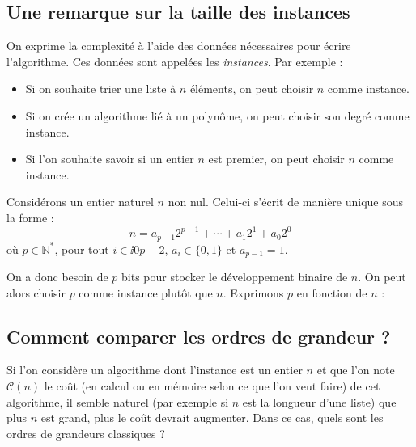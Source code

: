 \documentclass[french,11pt,twoside]{VcCours}
\begin{document}
\subsection{Une remarque sur la taille des instances}
On exprime la complexité à l'aide des données nécessaires pour écrire l'algorithme. Ces données sont appelées les \emph{instances}. Par exemple :

\begin{itemize}
\item Si on souhaite trier une liste à $n$ éléments, on peut choisir $n$ comme instance.
\item Si on crée un algorithme lié à un polynôme, on peut choisir son degré comme instance. 
\item Si l'on souhaite savoir si un entier $n$ est premier, on peut choisir $n$ comme instance.
\end{itemize}

\medskip

\begin{Remarque}[\alerte]{}

    Considérons un entier naturel $n$ non nul. Celui-ci s'écrit de manière unique sous la forme :
$$ n = a_{p-1}2^{p-1} + \cdots + a_1 2^1 + a_0 2^0$$
où $p \in \mathbb{N}^*$, pour tout $i \in \ii{0}{p-2}$, $a_i \in \lbrace 0,1 \rbrace$ et $a_{p-1}=1$.

\medskip

On a donc besoin de $p$ bits pour stocker le développement binaire de $n$. 
On peut alors choisir $p$ comme instance plutôt que $n$. 
Exprimons $p$ en fonction de $n$ :

\vspace{7cm}
\medskip

\end{Remarque}




\subsection{Comment comparer les ordres de grandeur ?}

Si l'on considère un algorithme dont l'instance est un entier $n$ et que l'on note $\mathcal{C}(n)$ le coût (en calcul ou en mémoire selon ce que l'on veut faire) de cet algorithme, il semble naturel (par exemple si $n$ est la longueur d'une liste) que plus $n$ est grand, plus le coût devrait augmenter. Dans ce cas, quels sont les ordres de grandeurs classiques ?
\end{document}
